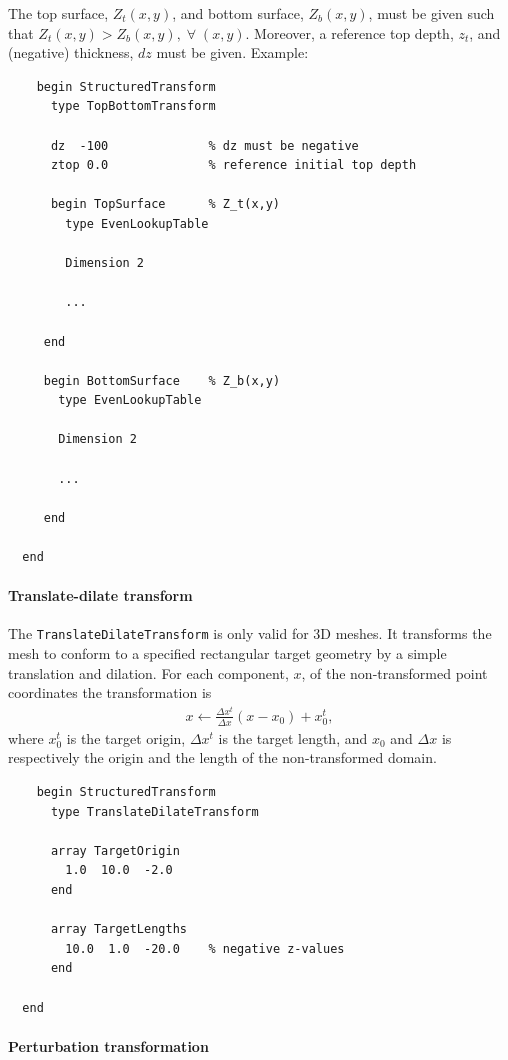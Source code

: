 The top surface, $Z_t(x,y)$, and bottom surface, $Z_b(x,y)$, must be
given such that $Z_t(x,y) > Z_b(x,y),\; \forall \;(x,y)$. Moreover,
a reference top depth, $z_t$, and (negative) thickness, $dz$ must be given. Example:
%
\begin{verbatim}
    begin StructuredTransform
      type TopBottomTransform

      dz  -100              % dz must be negative
      ztop 0.0              % reference initial top depth

      begin TopSurface      % Z_t(x,y)
        type EvenLookupTable

        Dimension 2

        ... 

     end

     begin BottomSurface    % Z_b(x,y)
       type EvenLookupTable

       Dimension 2

       ... 

     end
  
  end
\end{verbatim}


\paragraph{Translate-dilate transform}
\label{sec:transl-dilate-transf}

The \texttt{TranslateDilateTransform} is only valid for 3D meshes. It
transforms the mesh to conform to a specified rectangular target
geometry by a simple translation and dilation. For each component,
$x$, of the non-transformed point coordinates the transformation is
%
\begin{align}
  x \leftarrow \frac{\Delta x^t}{\Delta x} (x-x_0)+x_0^t,
\end{align}
%
where $x_0^t$ is the target origin, $\Delta x^t$ is the target length,
and $x_0$ and $\Delta x$ is respectively the origin and the length of
the non-transformed domain. 
%
\begin{verbatim}
    begin StructuredTransform
      type TranslateDilateTransform

      array TargetOrigin
        1.0  10.0  -2.0
      end

      array TargetLengths
        10.0  1.0  -20.0    % negative z-values
      end
  
  end
\end{verbatim}


\paragraph{Perturbation transformation}
\label{sec:pert-transf}

